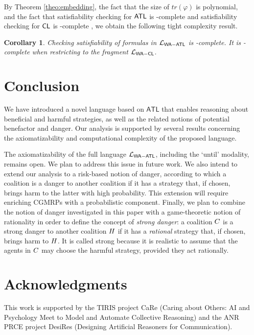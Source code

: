 \documentclass{article}
\newtheorem{corollary}{Corollary}
\begin{document}
By Theorem \ref{theo:embedding}, the fact that the size of $\mathit{tr}(\varphi) $
is polynomial, and the fact that satisfiability checking
for $\mathsf{ATL}$
is \Exptime-complete \cite{DrimmelenLICS}
and
satisfiability checking
for $\mathsf{CL} $
is \Pspace-complete \cite{DBLP:journals/logcom/Pauly02}, we obtain  the following tight complexity result.
  \begin{corollary}
Checking satisfiability of
 formulas in $\mathcal{L}_{\mathsf{WA{-}ATL}}$
is  \Exptime-complete.
It is \Pspace-complete 
when 
restricting to the fragment $\mathcal{L}_{\mathsf{WA{-}CL}}$. 
  \end{corollary}



\section{Conclusion}\label{conclusion}

We have introduced a novel language based on $\mathsf{ATL}$ that enables reasoning about beneficial and harmful strategies, as well as the related notions of potential benefactor and danger. Our analysis is supported by several results concerning the axiomatizability and computational complexity of the proposed language.

The axiomatizability of the full language $\mathcal{L}_{\mathsf{WA{-}ATL}}$, including the `until' modality, remains open. We plan to address this issue in future work. We also intend to extend our analysis to a risk-based notion of danger, according to which a coalition is a danger to another coalition if it has a strategy that, if chosen, brings harm to the latter with high probability. This extension will require enriching CGMRPs with a probabilistic component. 
Finally, we plan to combine the notion of danger investigated in this paper with a game-theoretic notion of rationality in order to define the concept of \emph{strong danger}: a coalition $C$ is a strong danger to another coalition $H$ if it has a \emph{rational} strategy that, if chosen, brings harm to $H$. It is called strong because it is realistic to assume that the agents in $C$ may choose the harmful strategy, provided they act rationally.


\section*{Acknowledgments}
This work is   supported by the TIRIS project CaRe (Caring about Others: AI and Psychology Meet to Model and Automate Collective
Reasoning) 
and the ANR PRCE project DesiRes (Designing Artificial Reasoners for Communication). 
\end{document}
